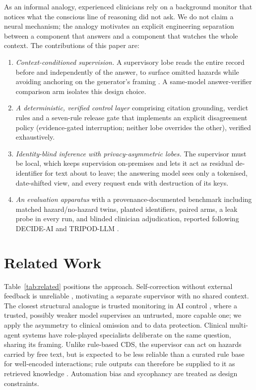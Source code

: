 \documentclass[journal]{IEEEtran}
\begin{document}
As an informal analogy, experienced clinicians rely on a background monitor that notices what the conscious line of reasoning did not ask. We do not claim a neural mechanism; the analogy motivates an explicit engineering separation between a component that answers and a component that watches the whole context. The contributions of this paper are:
\begin{enumerate}
\item \emph{Context-conditioned supervision.} A supervisory lobe reads the entire record before and independently of the answer, to surface omitted hazards while avoiding anchoring on the generator's framing \cite{tversky1974}. A same-model answer-verifier comparison arm isolates this design choice.
\item \emph{A deterministic, verified control layer} comprising citation grounding, verdict rules and a seven-rule release gate that implements an explicit disagreement policy (evidence-gated interruption; neither lobe overrides the other), verified exhaustively.
\item \emph{Identity-blind inference with privacy-asymmetric lobes.} The supervisor must be local, which keeps supervision on-premises and lets it act as residual de-identifier for text about to leave; the answering model sees only a tokenised, date-shifted view, and every request ends with destruction of its keys.
\item \emph{An evaluation apparatus} with a provenance-documented benchmark including matched hazard/no-hazard twins, planted identifiers, paired arms, a leak probe in every run, and blinded clinician adjudication, reported following DECIDE-AI \cite{vasey2022} and TRIPOD-LLM \cite{gallifant2025}.
\end{enumerate}

\section{Related Work}
Table~\ref{tab:related} positions the approach. Self-correction without external feedback is unreliable \cite{huang2024}, motivating a separate supervisor with no shared context. The closest structural analogue is trusted monitoring in AI control \cite{greenblatt2024}, where a trusted, possibly weaker model supervises an untrusted, more capable one; we apply the asymmetry to clinical omission and to data protection. Clinical multi-agent systems \cite{tang2024,kim2024} have role-played specialists deliberate on the same question, sharing its framing. Unlike rule-based CDS, the supervisor can act on hazards carried by free text, but is expected to be less reliable than a curated rule base for well-encoded interactions; rule outputs can therefore be supplied to it as retrieved knowledge \cite{lewis2020,zakka2024}. Automation bias \cite{goddard2012,parasuraman1997} and sycophancy \cite{sharma2024} are treated as design constraints.
\end{document}
